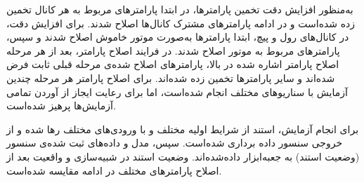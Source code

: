 به‌منظور افزایش دقت تخمین پارامترها، در ابتدا پارامترهای مربوط به هر کانال تخمین زده شده‌است و در ادامه پارامترهای مشترک کانال‌ها اصلاح شدند.
 برای افزایش دقت، در کانال‌های رول و پیچ، ابتدا پارامترها به‌صورت موتور خاموش اصلاح شدند و سپس، پارامترهای مربوط به موتور اصلاح شدند.
در فرایند اصلاح پارامتر، بعد از هر مرحله اصلاح پارامتر اشاره شده در بالا،  پارامترهای اصلاح شده‌ی مرحله قبلی ثابت فرض شده‌اند و سایر پارامترها تخمین زده شده‌اند.
برای اصلاح پارامتر هر مرحله چندین آزمایش با سناریوهای مختلف انجام شده‌است،
اما برای رعایت ایجاز از آوردن تمامی آزمایش‌ها پرهیز شده‌است.



برای انجام آزمایش، استند از شرایط اولیه مختلف و با ورودی‌های مختلف رها شده و از خروجی سنسور داده برداری شده‌است. سپس، مدل و داده‌های ثبت شده‌ی سنسور (وضعیت استند) به جعبه‌ابزار
 داده‌شده‌اند. 
وضعیت استند در شبیه‌سازی و واقعیت بعد از اصلاح پارامترهای مختلف
در ادامه مقایسه شده‌است.











